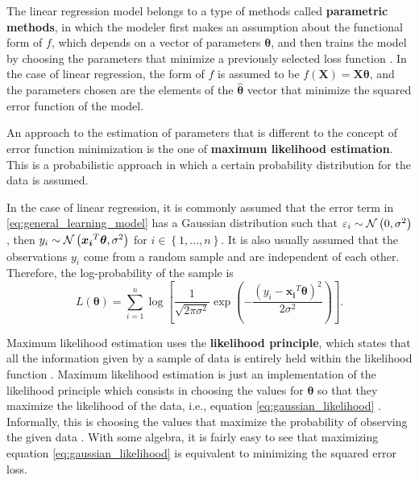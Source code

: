 The linear regression model belongs to a type of methods called \textbf{parametric methods}, in which the modeler first makes an assumption about the functional form of $f$, which depends on a vector of parameters $\boldsymbol{\theta}$, and then trains the model by choosing the parameters that minimize a previously selected loss function \cite[p.~21]{james2013introduction}. In the case of linear regression, the form of $f$ is assumed to be $f(\boldsymbol{X}) = \boldsymbol{X}\boldsymbol{\theta}$, and the parameters chosen are the elements of the $\hat{\boldsymbol{\theta}}$ vector that minimize the squared error function of the model.

An approach to the estimation of parameters that is different to the concept of error function minimization is the one of \textbf{maximum likelihood estimation}.
This is a probabilistic approach in which a certain probability distribution for the data is assumed.

In the case of linear regression, it is commonly assumed that the error term in \eqref{eq:general_learning_model} has a Gaussian distribution such that $\varepsilon_i \sim \mathcal{N}\left( 0, \sigma^2 \right)$, then $y_i \sim \mathcal{N}\left( \boldsymbol{x_i}^T \boldsymbol{\theta}, \sigma^2 \right)$ for $i \in \left\{ 1, \ldots, n \right\}$. It is also usually assumed that the observations $y_i$ come from a random sample and are independent of each other. Therefore, the log-probability of the sample is
\begin{equation}
  \label{eq:gaussian_likelihood}
  L(\boldsymbol{\theta}) = \sum_{i = 1}^n \log \left[ \frac{1}{\sqrt{2 \pi \sigma^2}} \exp \left({- \frac{(y_i - \boldsymbol{x_i}^T \boldsymbol{\theta})^2}{2\sigma^2}}\right) \right].
\end{equation}


Maximum likelihood estimation uses the \textbf{likelihood principle}, which states that all the information given by a sample of data is entirely held within the likelihood function \cite{gelman2013bayesian} \cite{robert2007bayesian}. Maximum likelihood estimation is just an implementation of the likelihood principle which consists in choosing the values for $\boldsymbol{\theta}$ so that they maximize the likelihood of the data, i.e., equation \eqref{eq:gaussian_likelihood} \cite{robert2007bayesian}. Informally, this is choosing the values that maximize the probability of observing the given data \cite[p.~31]{friedman2001elements} \cite{robert2007bayesian}. With some algebra, it is fairly easy to see that maximizing equation \eqref{eq:gaussian_likelihood} is equivalent to minimizing the squared error loss.

